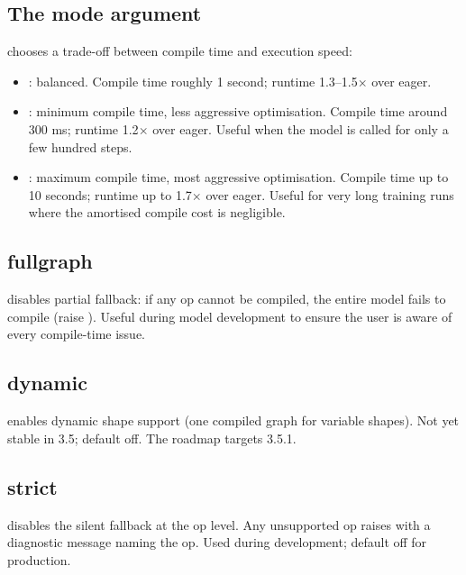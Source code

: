 \subsection{The mode argument}
\label{ssec:compiled_module:mode}

 chooses a trade-off between compile time and
execution speed:

\begin{itemize}
  \item {}: balanced. Compile time roughly 1
    second; runtime 1.3--1.5$\times$ over eager.
  \item {}: minimum compile time, less
    aggressive optimisation. Compile time around 300 ms; runtime
    1.2$\times$ over eager. Useful when the model is called for
    only a few hundred steps.
  \item {}: maximum compile time, most
    aggressive optimisation. Compile time up to 10 seconds;
    runtime up to 1.7$\times$ over eager. Useful for very long
    training runs where the amortised compile cost is
    negligible.
\end{itemize}

\subsection{fullgraph}
\label{ssec:compiled_module:fullgraph}

 disables partial fallback: if any op cannot
be compiled, the entire model fails to compile (raise
). Useful during model development to ensure
the user is aware of every compile-time issue.

\subsection{dynamic}
\label{ssec:compiled_module:dynamic}

 enables dynamic shape support (one compiled
graph for variable shapes). Not yet stable in 3.5; default off.
The roadmap targets 3.5.1.

\subsection{strict}
\label{ssec:compiled_module:strict}

 disables the silent fallback at the op level.
Any unsupported op raises with a diagnostic message naming the
op. Used during development; default off for production.

